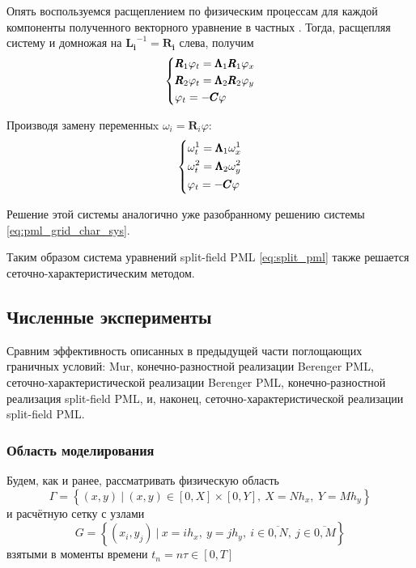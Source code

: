 Опять воспользуемся расщеплением по физическим процессам для каждой компоненты полученного векторного уравнение в частных \cite{rashep_marchuk}. Тогда, расщепляя систему и домножая на $\pmb{L_i}^{-1}=\pmb{R_i}$ слева, получим
\begin{equation}
    \begin{dcases}
        \pmb{R}_1\varphi_t = \pmb{\Lambda}_1\pmb{R}_1 \varphi_x\\
        \pmb{R}_2\varphi_t = \pmb{\Lambda}_2\pmb{R}_2 \varphi_y\\
        \varphi_t = - \pmb{C} \varphi  
    \end{dcases}
\end{equation}

Производя замену переменныx $\omega_i = \pmb{R}_i \varphi$:
\begin{equation}
    \begin{dcases}
        \omega_t^1 = \pmb{\Lambda}_1\omega_x^1 \\
        \omega_t^2 = \pmb{\Lambda}_2\omega_y^2 \\
        \varphi_t = - \pmb{C} \varphi  
    \end{dcases}
\end{equation}

Решение этой системы аналогично уже разобранному решению системы \eqref{eq:pml_grid_char_sys}. 

Таким образом система уравнений split-field PML \eqref{eq:split_pml} также решается сеточно-характеристическим методом.

\subsection{Численные эксперименты}

Сравним эффективность описанных в предыдущей части поглощающих граничных условий: Mur, конечно-разностной реализации Berenger PML, сеточно-характеристической реализации Berenger PML, конечно-разностной реализация split-field PML, и, наконец, сеточно-характеристической реализации split-field PML.

\subsubsection{Область моделирования}

Будем, как и ранее, рассматривать физическую область 
$$\Gamma = \left\{(x,y) ~|~ (x,y) \in [0,X]\times[0,Y],~ X=N h_x,~ Y=M h_y\right\}$$ 
и расчётную сетку с узлами
$$G = \left\{(x_i,y_j) ~|~ x=ih_x, ~y=jh_y, ~i \in \overline{0,N},~ j \in \overline{0,M}\right\}$$
взятыми в моменты времени $t_n = n\tau \in [0,T]$

